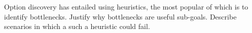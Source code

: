 \documentclass[solution,addpoints,12pt]{exam}
\begin{document}
\begin{questions}


\question[3] Option discovery has entailed using heuristics, the most popular of which is to identify bottlenecks. Justify why bottlenecks are useful sub-goals. Describe scenarios in which a such a heuristic could fail.
\begin{solution}

\end{solution}

\end{questions}
\end{document}
